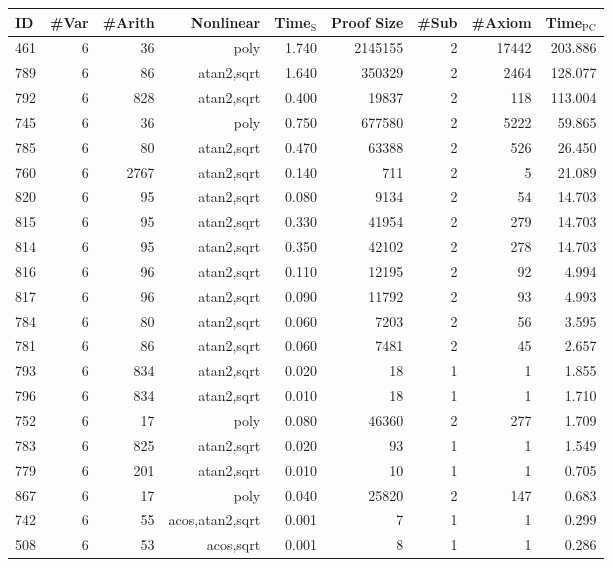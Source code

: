 \begin{table*}[t!h!]
  \begin{center}
\begin{tabular}{|l||r|r|r||r|r|r|r|r|}
\hline
ID & \#Var & \#Arith & Nonlinear & Time$_{\text{S}}$ & Proof Size & \#Sub & \#Axiom & Time$_{\text{PC}}$ \\
\hline
\hline
461 & 6 & 36 & poly & 1.740 & 2145155 & 2 & 17442 & 203.886 \\
\hline
789 & 6 & 86 & atan2,sqrt & 1.640 & 350329 & 2 & 2464 & 128.077 \\
\hline
792 & 6 & 828 & atan2,sqrt & 0.400 & 19837 & 2 & 118 & 113.004 \\
\hline
745 & 6 & 36 & poly & 0.750 & 677580 & 2 & 5222 & 59.865 \\
\hline
785 & 6 & 80 & atan2,sqrt & 0.470 & 63388 & 2 & 526 & 26.450 \\
\hline
760 & 6 & 2767 & atan2,sqrt & 0.140 & 711 & 2 & 5 & 21.089 \\
\hline
820 & 6 & 95 & atan2,sqrt & 0.080 & 9134 & 2 & 54 & 14.703 \\
\hline
815 & 6 & 95 & atan2,sqrt & 0.330 & 41954 & 2 & 279 & 14.703 \\
\hline
814 & 6 & 95 & atan2,sqrt & 0.350 & 42102 & 2 & 278 & 14.703 \\
\hline
816 & 6 & 96 & atan2,sqrt & 0.110 & 12195 & 2 & 92 & 4.994 \\
\hline
817 & 6 & 96 & atan2,sqrt & 0.090 & 11792 & 2 & 93 & 4.993 \\
\hline
784 & 6 & 80 & atan2,sqrt & 0.060 & 7203 & 2 & 56 & 3.595 \\
\hline
781 & 6 & 86 & atan2,sqrt & 0.060 & 7481 & 2 & 45 & 2.657 \\
\hline
793 & 6 & 834 & atan2,sqrt & 0.020 & 18 & 1 & 1 & 1.855 \\
\hline
796 & 6 & 834 & atan2,sqrt & 0.010 & 18 & 1 & 1 & 1.710 \\
\hline
752 & 6 & 17 &  poly & 0.080 & 46360 & 2 & 277 & 1.709 \\
\hline
783 & 6 & 825 &atan2,sqrt & 0.020 & 93 & 1 & 1 & 1.549 \\
\hline
779 & 6 & 201 & atan2,sqrt & 0.010 & 10 & 1 & 1 & 0.705 \\
\hline
867 & 6 & 17 &  poly & 0.040 & 25820 & 2 & 147 & 0.683 \\
\hline
742 & 6 & 55 & acos,atan2,sqrt & 0.001 & 7 & 1 & 1 & 0.299 \\
\hline
508 & 6 & 53 & acos,sqrt & 0.001 & 8 & 1 & 1 & 0.286 \\

\end{tabular}
\end{center}
\end{table*}
